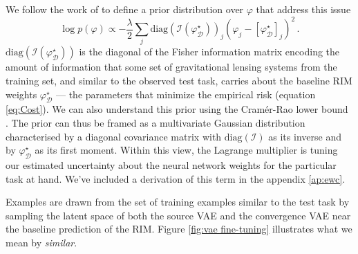 We follow the work of \citet{Kirkpatrick2016} to define a prior distribution
over $\varphi$ that address this issue
\begin{equation}\label{eq:Prior} 
        \log p(\varphi) \propto -\frac{\lambda}{2}\sum_{j} \mathrm{diag}(\mathcal{I}(\varphi_{\mathcal{D}}^{\star}))_{j} 
        (\varphi_j - [\varphi^{\star}_{\mathcal{D}}]_{j})^{2}\, .
\end{equation} 
$\mathrm{diag}(\mathcal{I}(\varphi_{\mathcal{D}}^{\star}))$ is the diagonal of the 
Fisher information matrix 
encoding the amount of information that  
some set of gravitational lensing systems from 
the training set, and similar to the observed 
test task, carries about the baseline RIM weights $\varphi_{\mathcal{D}}^{\star}$ 
--- the parameters that minimize the empirical risk (equation \ref{eq:Cost}).
We can also understand this prior using the
Cramér-Rao lower bound 
\citep{Rao1945,Cramer1946}.
The prior can thus be framed as a multivariate 
Gaussian distribution characterised by a diagonal covariance matrix with $\mathrm{diag}(\mathcal{I})$ as its inverse 
and by $\varphi^{\star}_{\mathcal{D}}$ as its first moment.
Within this view, the  
Lagrange multiplier is 
tuning our estimated uncertainty about the neural network weights 
for the particular task at hand.  
We've included a derivation 
of this term in the appendix \ref{ap:ewc}.

Examples are drawn from the set of training examples similar to the test task 
by sampling the latent space of both the source 
VAE and the convergence VAE near the baseline prediction of the RIM. Figure \ref{fig:vae fine-tuning} illustrates what we mean by \textit{similar}. 

